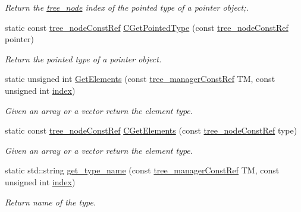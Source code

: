 \begin{DoxyCompactItemize}
\begin{DoxyCompactList}\small\item\em Return the \hyperlink{classtree__node}{tree\+\_\+node} index of the pointed type of a pointer object;. \end{DoxyCompactList}\item 
static const \hyperlink{tree__node_8hpp_a3cf5d02292c940f3892425a5b5fdec3c}{tree\+\_\+node\+Const\+Ref} \hyperlink{classtree__helper_aa65ede36196d49543afb324151f71ed3}{C\+Get\+Pointed\+Type} (const \hyperlink{tree__node_8hpp_a3cf5d02292c940f3892425a5b5fdec3c}{tree\+\_\+node\+Const\+Ref} pointer)
\begin{DoxyCompactList}\small\item\em Return the pointed type of a pointer object. \end{DoxyCompactList}\item 
static unsigned int \hyperlink{classtree__helper_a138ece972399ec580cd0f48ef6a3b0e9}{Get\+Elements} (const \hyperlink{tree__manager_8hpp_a792e3f1f892d7d997a8d8a4a12e39346}{tree\+\_\+manager\+Const\+Ref} TM, const unsigned int \hyperlink{tutorial__pact__2019_2Introduction_2third_2include_2Keccak_8h_a028c9bdc8344cca38ab522a337074797}{index})
\begin{DoxyCompactList}\small\item\em Given an array or a vector return the element type. \end{DoxyCompactList}\item 
static const \hyperlink{tree__node_8hpp_a3cf5d02292c940f3892425a5b5fdec3c}{tree\+\_\+node\+Const\+Ref} \hyperlink{classtree__helper_a9119915404743215b4f3a6bb15718375}{C\+Get\+Elements} (const \hyperlink{tree__node_8hpp_a3cf5d02292c940f3892425a5b5fdec3c}{tree\+\_\+node\+Const\+Ref} type)
\begin{DoxyCompactList}\small\item\em Given an array or a vector return the element type. \end{DoxyCompactList}\item 
static std\+::string \hyperlink{classtree__helper_af20cbfb32e0a8e29ce353e57e358b823}{get\+\_\+type\+\_\+name} (const \hyperlink{tree__manager_8hpp_a792e3f1f892d7d997a8d8a4a12e39346}{tree\+\_\+manager\+Const\+Ref} TM, const unsigned int \hyperlink{tutorial__pact__2019_2Introduction_2third_2include_2Keccak_8h_a028c9bdc8344cca38ab522a337074797}{index})
\begin{DoxyCompactList}\small\item\em Return name of the type. \end{DoxyCompactList}\item 

\end{DoxyCompactItemize}

